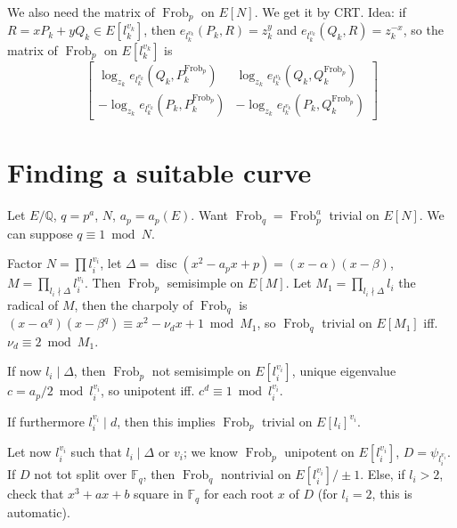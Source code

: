 \documentclass[12pt]{article}
\newcommand{\Q}{\mathbb{Q}}
\newcommand{\F}{\mathbb{F}}
\newcommand{\disc}{\operatorname{disc}}
\newcommand{\Frob}{\operatorname{Frob}}
\theoremstyle{definition}
\begin{document}
We also need the matrix of $\Frob_p$ on $E[N]$. We get it by CRT. Idea: if $R = x P_k + y Q_k \in E[l_k^{v_k}]$, then $e_{l_k^{v_k}}(P_k,R) = z_k^y$ and $e_{l_k^{v_k}}(Q_k,R) = z_k^{-x}$, so the matrix of $\Frob_p$ on $E[l_k^{v_k}]$ is
\[ \left[ \begin{matrix} \log_{z_k} e_{l_k^{v_k}}(Q_k,P_k^{\Frob_p}) & \log_{z_k} e_{l_k^{v_k}}(Q_k,Q_k^{\Frob_p}) \\ -\log_{z_k} e_{l_k^{v_k}}(P_k,P_k^{\Frob_p}) & -\log_{z_k} e_{l_k^{v_k}}(P_k,Q_k^{\Frob_p}) \end{matrix} \right] \]

\section{Finding a suitable curve}

Let $E/\Q$, $q=p^a$, $N$, $a_p=a_p(E)$. Want $\Frob_q = \Frob_p^a$ trivial on $E[N]$. We can suppose $q \equiv 1 \bmod N$.

Factor $N = \prod l_i^{v_i}$, let $\Delta = \disc(x^2-a_p x+p)=(x-\alpha)(x-\beta)$, $M = \prod_{l_i \nmid \Delta} l_i^{v_i}$. Then $\Frob_p$ semisimple on $E[M]$. Let $M_1 = \prod_{l_i \nmid \Delta} l_i$ the radical of $M$, then the charpoly of $\Frob_q$ is $(x-\alpha^q)(x-\beta^q) \equiv x^2-\nu_d x + 1 \bmod M_1$, so $\Frob_q$ trivial on $E[M_1]$ iff. $\nu_d \equiv 2 \bmod M_1$.

If now $l_i \mid \Delta$, then $\Frob_p$ not semisimple on $E[l_i^{v_i}]$, unique eigenvalue $c = a_p/2 \bmod l_i^{v_i}$, so unipotent iff. $c^d \equiv 1 \bmod l_i^{v_i}$.

If furthermore $l_i^{v_i} \mid d$, then this implies $\Frob_p$ trivial on $E[l_i]^{v_i}$.

Let now $l_i^{v_i}$ such that $l_i \mid \Delta$ or $v_i$; we know $\Frob_p$ unipotent on $E[l_i^{v_i}]$, $D=\psi_{l_i^{v_i}}$. If $D$ not tot split over $\F_q$, then $\Frob_q$ nontrivial on $E[l_i^{v_i}]/\pm1$. Else, if $l_i > 2$, check that $x^3+ax+b$ square in $\F_q$ for each root $x$ of $D$ (for $l_i=2$, this is automatic). 
\end{document}
